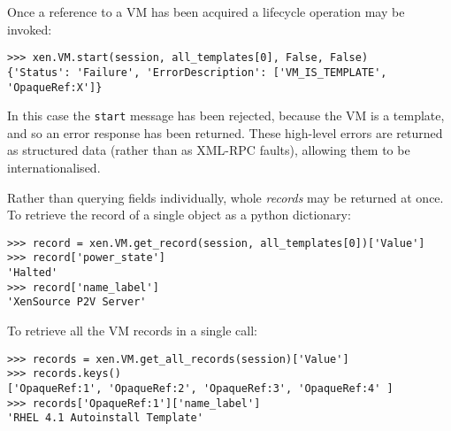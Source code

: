 Once a reference to a VM has been acquired a lifecycle operation may be invoked:
\begin{verbatim}
>>> xen.VM.start(session, all_templates[0], False, False)
{'Status': 'Failure', 'ErrorDescription': ['VM_IS_TEMPLATE', 'OpaqueRef:X']}
\end{verbatim}
In this case the {\tt start} message has been rejected, because the VM is
a template, and so an error response has been returned.  These high-level
errors are returned as structured data (rather than as XML-RPC faults),
allowing them to be internationalised.  

Rather than querying fields individually, whole {\em records} may be returned at once.
To retrieve the record of a single object as a python dictionary:
\begin{verbatim}
>>> record = xen.VM.get_record(session, all_templates[0])['Value']
>>> record['power_state']
'Halted'
>>> record['name_label']
'XenSource P2V Server'
\end{verbatim}

To retrieve all the VM records in a single call:
\begin{verbatim}
>>> records = xen.VM.get_all_records(session)['Value']
>>> records.keys()
['OpaqueRef:1', 'OpaqueRef:2', 'OpaqueRef:3', 'OpaqueRef:4' ]
>>> records['OpaqueRef:1']['name_label']
'RHEL 4.1 Autoinstall Template'
\end{verbatim}




